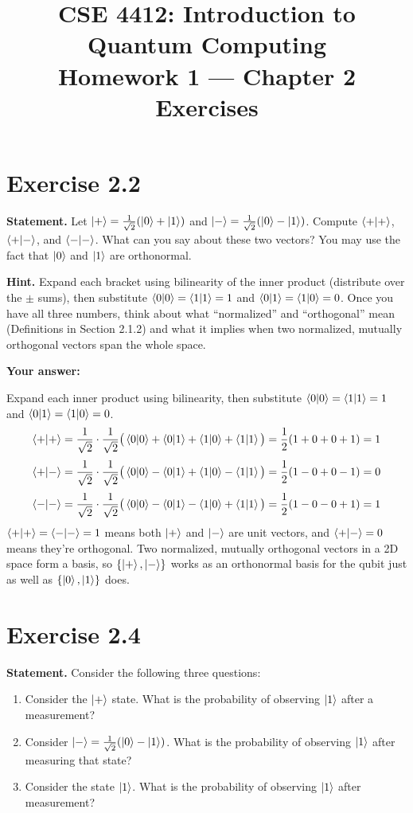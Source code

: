 \documentclass[11pt]{article}
\title{CSE 4412: Introduction to Quantum Computing \\ Homework 1 --- Chapter 2 Exercises}
\author{}
\date{}
\begin{document}
\maketitle

\section*{Exercise 2.2}
\textbf{Statement.} Let $\ket{+} = \frac{1}{\sqrt{2}}(\ket{0} + \ket{1})$ and $\ket{-} = \frac{1}{\sqrt{2}}(\ket{0} - \ket{1})$. Compute $\braket{+|+}$, $\braket{+|-}$, and $\braket{-|-}$. What can you say about these two vectors? You may use the fact that $\ket{0}$ and $\ket{1}$ are orthonormal.

\textbf{Hint.} Expand each bracket using bilinearity of the inner product (distribute over the $\pm$ sums), then substitute $\braket{0|0}=\braket{1|1}=1$ and $\braket{0|1}=\braket{1|0}=0$. Once you have all three numbers, think about what ``normalized'' and ``orthogonal'' mean (Definitions in Section 2.1.2) and what it implies when two normalized, mutually orthogonal vectors span the whole space.

\textbf{Your answer:}

Expand each inner product using bilinearity, then substitute $\braket{0|0}=\braket{1|1}=1$ and $\braket{0|1}=\braket{1|0}=0$.
\[
\braket{+|+} = \frac{1}{\sqrt2}\cdot\frac{1}{\sqrt2}\big(\braket{0|0}+\braket{0|1}+\braket{1|0}+\braket{1|1}\big) = \frac12(1+0+0+1) = 1
\]
\[
\braket{+|-} = \frac{1}{\sqrt2}\cdot\frac{1}{\sqrt2}\big(\braket{0|0}-\braket{0|1}+\braket{1|0}-\braket{1|1}\big) = \frac12(1-0+0-1) = 0
\]
\[
\braket{-|-} = \frac{1}{\sqrt2}\cdot\frac{1}{\sqrt2}\big(\braket{0|0}-\braket{0|1}-\braket{1|0}+\braket{1|1}\big) = \frac12(1-0-0+1) = 1
\]
$\braket{+|+}=\braket{-|-}=1$ means both $\ket{+}$ and $\ket{-}$ are unit vectors, and $\braket{+|-}=0$ means they're orthogonal. Two normalized, mutually orthogonal vectors in a 2D space form a basis, so $\{\ket{+},\ket{-}\}$ works as an orthonormal basis for the qubit just as well as $\{\ket{0},\ket{1}\}$ does.

\vspace{1cm}

\section*{Exercise 2.4}
\textbf{Statement.} Consider the following three questions:
\begin{enumerate}
    \item Consider the $\ket{+}$ state. What is the probability of observing $\ket{1}$ after a measurement?
    \item Consider $\ket{-} = \frac{1}{\sqrt{2}}(\ket{0} - \ket{1})$. What is the probability of observing $\ket{1}$ after measuring that state?
    \item Consider the state $\ket{1}$. What is the probability of observing $\ket{1}$ after measurement?
\end{enumerate}
\end{document}
